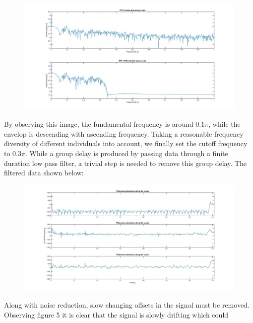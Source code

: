 \documentclass[10pt,twocolumn,letterpaper]{article}
\begin{document}
\begin{figure}[t]
\begin{center}
   \includegraphics[width=0.8\linewidth]{../img/fig2.jpg}
   \caption{}
\end{center}
\end{figure}

By observing this image, the fundamental frequency is around $0.1\pi$, while the envelop is descending with ascending frequency. Taking a reasonable frequency diversity of different individuals into account, we finally set the cutoff frequency to $0.3\pi$. While a group delay is produced by passing data through a finite duration low pass filter, a trivial step is needed to remove this group delay. The filtered data shown below:

\begin{figure}[t]
\begin{center}
   \includegraphics[width=0.8\linewidth]{../img/fig3.jpg}
   \caption{}
\end{center}
\end{figure}

Along with noise reduction, slow changing offsets in the signal must be removed.  Observing figure 5 it is clear that the signal is slowly drifting which could
\end{document}
